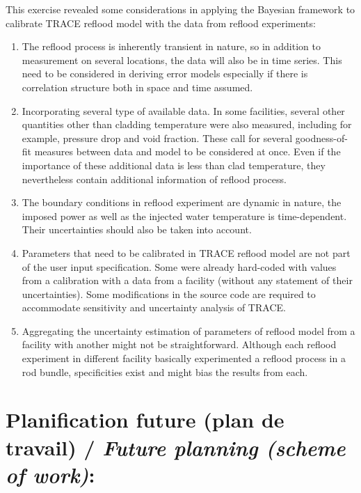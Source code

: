 \documentclass[11pt,titlepage]{article}
\begin{document}
This exercise revealed some considerations in applying the Bayesian framework to calibrate TRACE reflood model with the data from reflood experiments:
\begin{enumerate}
	\item The reflood process is inherently transient in nature, so in addition to measurement on several locations, the data will also be in time series. 
	This need to be considered in deriving error models especially if there is correlation structure both in space and time assumed.
	\item Incorporating several type of available data. 
	In some facilities, several other quantities other than cladding temperature were also measured, including for example, pressure drop and void fraction. 
	These call for several goodness-of-fit measures between data and model to be considered at once. 
	Even if the importance of these additional data is less than clad temperature, they nevertheless contain additional information of reflood process.
	\item The boundary conditions in reflood experiment are dynamic in nature, the imposed power as well as the injected water temperature is time-dependent. 
	Their uncertainties should also be taken into account.
	\item Parameters that need to be calibrated in TRACE reflood model are not part of the user input specification. 
	Some were already hard-coded with values from a calibration with a data from a facility (without any statement of their uncertainties). 
	Some modifications in the source code are required to accommodate sensitivity and uncertainty analysis of TRACE.
	\item Aggregating the uncertainty estimation of parameters of reflood model from a facility with another might not be straightforward. 
	Although each reflood experiment in different facility basically experimented a reflood process in a rod bundle, specificities exist and might bias the results from each.
\end{enumerate}

\newpage
\section{Planification future (plan de travail) /  {\large\textit{Future planning (scheme of work)}}:}
\end{document}
